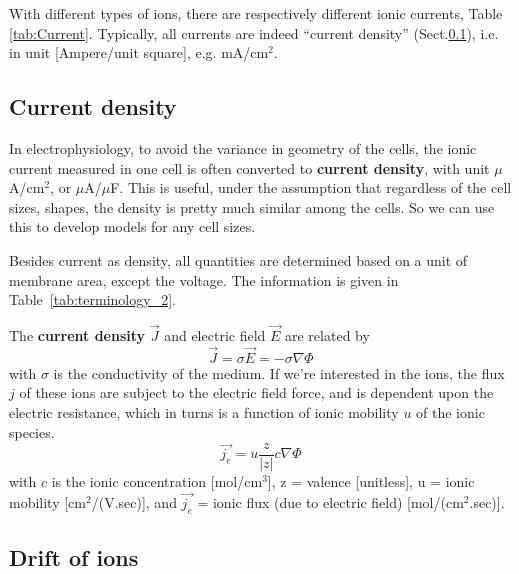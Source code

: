 With different types of ions, there are respectively different ionic currents,
Table \ref{tab:Current}. Typically, all currents are indeed ``current density''
(Sect.\ref{sec:current-density}), i.e. in unit [Ampere/unit square], e.g.
mA/cm$^2$.


\subsection{Current density}
\label{sec:current-density}

In electrophysiology, to avoid the variance in geometry of the cells, the ionic
current measured in one cell is often converted to {\bf current density},
with unit $\mu$A/cm$^2$, or $\mu$A/$\mu$F. This is useful, under the assumption
that regardless of the cell sizes, shapes, the density is pretty much similar
among the cells. So we can use this to develop models for any cell sizes.

Besides current as density, all quantities are determined based on a unit of
membrane area, except the voltage. The information is given in
Table~\ref{tab:terminology_2}.

The {\bf current density} $\overrightarrow{J}$ and electric field
$\overrightarrow{E}$ are related by
\begin{equation}
  \label{eq:1224}
  \overrightarrow{J} = \sigma \overrightarrow{E} = -\sigma \nabla \Phi
\end{equation}
with $\sigma$ is the conductivity of the medium. If we're interested
in the ions, the flux $j$ of these ions are subject to the electric field
force, and is dependent upon the electric resistance, which in turns
is a function of ionic mobility $u$ of the ionic species. 
\begin{equation}
  \label{eq:1225}
  \overrightarrow{j_e} = u \frac{z}{|z|}c\nabla \Phi
\end{equation}
with $c$ is the ionic concentration [mol/cm$^3$], z = valence
[unitless], u = ionic mobility [cm$^2$/(V.sec)], and
$\overrightarrow{j_e}$ = ionic flux (due to electric field)
[mol/(cm$^2$.sec)]. 


\subsection{Drift of ions}
\label{sec:drift-ions}

